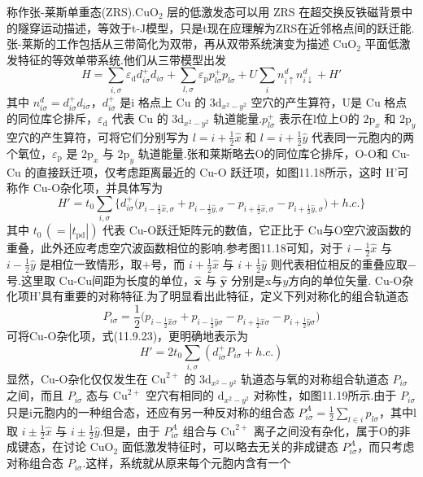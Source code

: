 称作张-莱斯单重态(ZRS).$\mathrm{CuO_{2}}$ 层的低激发态可以用 ZRS 在超交换反铁磁背景中的隧穿运动描述，等效于t-J模型，只是t现在应理解为ZRS在近邻格点间的跃迁能.张-莱斯的工作包括从三带简化为双带，再从双带系统演变为描述 $\mathrm{CuO_{2}}$ 平面低激发特征的等效单带系统.他们从三带模型出发
\begin{equation}
  H=\sum_{i,\sigma}\varepsilon_{\mathrm{d}}d_{i\sigma}^{+}d_{i\sigma}
  +\sum_{l,\sigma}\varepsilon_{\mathrm{p}}p_{l\sigma}^{+}p_{l\sigma}
  +U\sum_{i}n_{i\uparrow}^{d}n_{i\downarrow}^{d}+H'
\end{equation}
其中 $n_{i\sigma}^{d}=d_{i\sigma}^{+}d_{i\sigma}$，$d_{i\sigma}^{+}$ 是i 格点上 Cu 的 $3\mathrm{d}_{x^{2}-y^{2}}$ 空穴的产生算符，U是 Cu 格点的同位库仑排斥，$\varepsilon_{\mathrm{d}}$ 代表 Cu 的 $3\mathrm{d}_{x^{2}-y^{2}}$ 轨道能量.$p_{l\sigma}^{+}$ 表示在l位上O的 $2\mathrm{p}_{x}$ 和 $2\mathrm{p}_{y}$ 空穴的产生算符，可将它们分别写为 $l=i+\frac{1}{2}\hat{x}$ 和 $l=i+\frac{1}{2}\hat{y}$ 代表同一元胞内的两个氧位，$\varepsilon_{\mathrm{p}}$ 是 $2\mathrm{p}_{x}$ 与 $2\mathrm{p}_{y}$ 轨道能量.张和莱斯略去O的同位库仑排斥，O-O和 Cu-Cu 的直接跃迁项，仅考虑距离最近的 Cu-O 跃迁项，如图11.18所示，这时 H'可称作 Cu-O杂化项，并具体写为
\begin{equation}
  H'=t_{0}\sum_{i,\sigma}\biggl\{d_{i\sigma}^{+}\biggl(p_{i-\frac{1}{2}\hat{x},\sigma}
  +p_{i-\frac{1}{2}\hat{y},\sigma}-p_{i+\frac{1}{2}\hat{x},\sigma}
  -p_{i+\frac{1}{2}\hat{y},\sigma}\biggr)+h.c.\biggr\}
\end{equation}
其中 $t_{0}\,(=|t_{\mathrm{pd}}|)$ 代表 Cu-O跃迁矩阵元的数值，它正比于 Cu与O空穴波函数的重叠，此外还应考虑空穴波函数相位的影响.参考图11.18可知，对于 $i-\frac{1}{2}\hat{x}$ 与 $i-\frac{1}{2}\hat{y}$ 是相位一致情形，取$+$号，而 $i+\frac{1}{2}\hat{x}$ 与 $i+\frac{1}{2}\hat{y}$ 则代表相位相反的重叠应取$-$号.这里取 Cu-Cu间距为长度的单位，$\hat{\boldsymbol{x}}$ 与 $\hat{\boldsymbol{y}}$ 分别是x与$y$方向的单位矢量. Cu-O杂化项H'具有重要的对称特征.为了明显看出此特征，定义下列对称化的组合轨道态
\begin{equation}
  P_{i\sigma}=\frac{1}{2}\biggl(p_{i-\frac{1}{2}\hat{x}\sigma}+p_{i-\frac{1}{2}\hat{y}\sigma}
  -p_{i+\frac{1}{2}\hat{x}\sigma}-p_{i+\frac{1}{2}\hat{y}\sigma}\biggr)
\end{equation}
可将Cu-O杂化项，式(11.9.23)，更明确地表示为
\begin{equation}
  H'=2t_{0}\sum_{i,\sigma}(d_{i\sigma}^{+}P_{i\sigma}+h.c.)
\end{equation}
显然，Cu-O杂化仅仅发生在 $\mathrm{Cu}^{2+}$ 的 $3\mathrm{d}_{x^{2}-y^{2}}$ 轨道态与氧的对称组合轨道态 $P_{i\sigma}$ 之间，而且 $P_{i\sigma}$ 态与 $\mathrm{Cu}^{2+}$ 空穴有相同的 $\mathrm{d}_{x^{2}-y^{2}}$ 对称性，如图11.19所示.由于 $P_{i\sigma}$ 只是i元胞内的一种组合态，还应有另一种反对称的组合态 $P_{i\sigma}^{A}=\frac{1}{2}\sum_{l\in i}p_{l\sigma}$，其中l取 $i\pm\frac{1}{2}\hat{x}$ 与 $i\pm\frac{1}{2}\hat{y}$.但是，由于 $P_{i\sigma}^{A}$ 组合与 $\mathrm{Cu}^{2+}$ 离子之间没有杂化，属于O的非成键态，在讨论 $\mathrm{CuO_{2}}$ 面低激发特征时，可以略去无关的非成键态 $P_{i\sigma}^{A}$，而只考虑对称组合态 $P_{i\sigma}$.这样，系统就从原来每个元胞内含有一个

